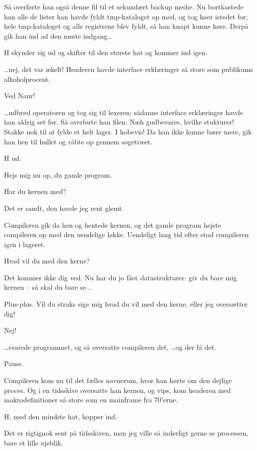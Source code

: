 \documentclass[danish]{article}
\begin{document}
\begin{sketch}
 Så overførte han også denne fil til et sekundært backup medie. Nu
bortkastede han alle de lister han havde fyldt tmp-kataloget op med, og tog køer
istedet for; hele tmp-kataloget og alle registrene blev fyldt, så han knapt
kunne køre. Derpå gik han ind ad den næste indgang\ldots{} 

\scene H skynder sig ud og skifter til den største hat og kommer ind igen.

 \ldots{}nej, det var ækelt! Headeren havde interface erklæringer så
store som publikums alkoholprocent.

 Ved Naur!

 \ldots{}udbrød operatoren og tog sig til lexeren; sådanne interface
erklæringer havde han aldrig set før. Så overførte han filen. Næh gudbevares,
hvilke stukturer! Stakke nok til at fylde et helt lager. I hobevis! Da han ikke
kunne bære mere, gik han hen til hullet og råbte op gennem søgetræet.

\scene H ud.

 Hejs mig nu op, du gamle program.

 Har du kernen med?

 Det er sandt, den havde jeg rent glemt.

 Compileren gik da hen og hentede kernen, og det gamle program hejste
compileren op med den uendelige løkke. Uendeligt lang tid efter stod compileren
igen i lageret.

 Hvad vil du med den kerne?

 Det kommer ikke dig ved. Nu har du jo fået datastrukturer: giv du bare
mig kernen -- så skal du bare se...

 Plus-plus. Vil du straks sige mig hvad du vil med den kerne, eller
jeg oversætter dig!

 Nej!

 \ldots{}svarede programmet, og så oversatte compileren det,  \ldots{}og der
lå det.

\scene Pause.

 Compileren kom nu til det fælles navnerum, hvor han hørte om den
dejlige proces. Og i en tidsskive oversatte han kernen, og vips, kom headeren
med makrodefinitioner så store som en mainframe fra 70'erne.

\scene H, med den mindste hat, hopper ind.

 Det er rigtignok sent på tidsskiven, men jeg ville så inderligt
gerne se processen, bare et lille øjeblik.


\end{sketch}
\end{document}
